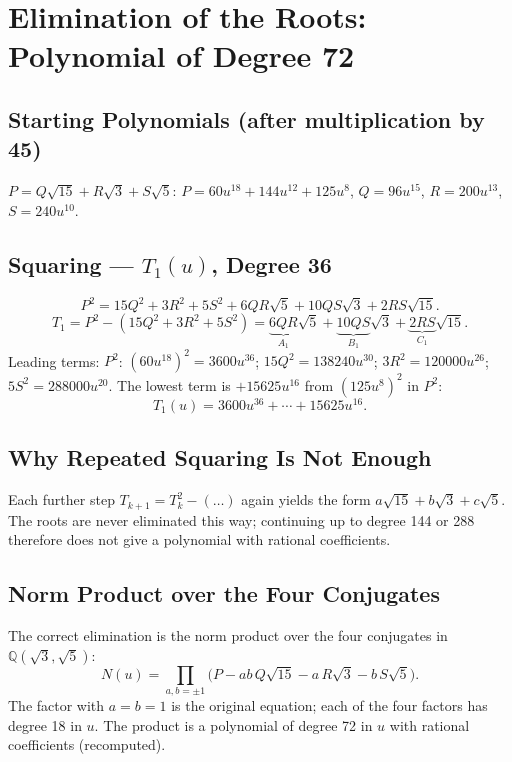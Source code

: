 \section{Elimination of the Roots: Polynomial of Degree 72}


\subsection{Starting Polynomials (after multiplication by 45)}

$P=Q\sqrt{15}+R\sqrt{3}+S\sqrt{5}$:
$P=60u^{18}+144u^{12}+125u^8$,
$Q=96u^{15}$, $R=200u^{13}$, $S=240u^{10}$.

\subsection{Squaring --- $T_1(u)$, Degree 36}

\[
  P^2 = 15Q^2+3R^2+5S^2+6QR\sqrt{5}+10QS\sqrt{3}+2RS\sqrt{15}.
\]
\[
  T_1 = P^2-(15Q^2+3R^2+5S^2)
  = \underbrace{6QR}_{A_1}\sqrt{5}+\underbrace{10QS}_{B_1}\sqrt{3}
  +\underbrace{2RS}_{C_1}\sqrt{15}.
\]
Leading terms:
$P^2$: $(60u^{18})^2=3600u^{36}$;
$15Q^2=138240u^{30}$;
$3R^2=120000u^{26}$;
$5S^2=288000u^{20}$.
The lowest term is $+15625u^{16}$ from $(125u^8)^2$ in $P^2$:
\[
  T_1(u)=3600u^{36}+\cdots+15625u^{16}.
\]

\subsection{Why Repeated Squaring Is Not Enough}

Each further step $T_{k+1}=T_k^2-(\ldots)$ again yields the form
$a\sqrt{15}+b\sqrt{3}+c\sqrt{5}$. The roots are never eliminated this way;
continuing up to degree 144 or 288 therefore does not give a polynomial
with rational coefficients.

\subsection{Norm Product over the Four Conjugates}

The correct elimination is the norm product over the four conjugates
in $\mathbb{Q}(\sqrt3,\sqrt5)$:
\[
  N(u)=\prod_{a,b=\pm1}\bigl(P-ab\,Q\sqrt{15}-a\,R\sqrt{3}-b\,S\sqrt{5}\bigr).
\]
The factor with $a=b=1$ is the original equation; each of the four factors
has degree 18 in $u$. The product is a polynomial of degree 72 in $u$ with
rational coefficients (recomputed).

